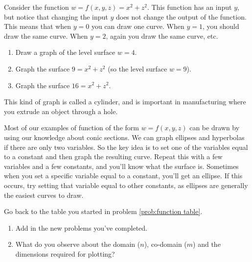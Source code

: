 \begin{problem}
%
%
Consider the function $w=f(x,y,z)=x^2+z^2$. This function has an input $y$, but notice that changing the input $y$ does not change the output of the function. This means that when $y=0$ you can draw one curve.  When $y=1$, you should draw the same curve.  When $y=2$, again you draw the same curve, etc.
 \begin{enumerate}
  \item Draw a graph of the level surface $w=4$.
  \item Graph the surface $9=x^2+z^2$ (so the level surface $w=9$).
  \item Graph the surface $16=x^2+z^2$.
 \end{enumerate}
This kind of graph is called a cylinder, and is important in manufacturing where you extrude an object through a hole.
\end{problem}

Most of our examples of function of the form $w=f(x,y,z)$ can be drawn by using our knowledge about conic sections. We can graph ellipses and hyperbolas if there are only two variables. So the key idea is to set one of the variables equal to a constant and then graph the resulting curve.  Repeat this with a few variables and a few constants, and you'll know what the surface is. Sometimes when you set a specific variable equal to a constant, you'll get an ellipse. If this occurs, try setting that variable equal to other constants, as ellipses are generally the easiest curves to draw.

\begin{problem}
Go back to the table you started in problem \ref{prob:function table}.
\begin{enumerate}
	\item Add in the new problems you've completed.
	\item What do you observe about the domain ($n$), co-domain ($m$) and the dimensions required for plotting?
\end{enumerate}
\end{problem}

